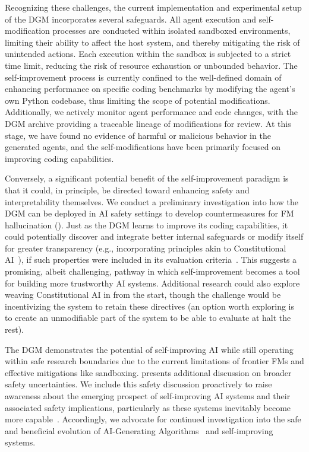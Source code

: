 \documentclass{article}
\begin{document}
Recognizing these challenges, the current implementation and experimental setup of the DGM incorporates several safeguards. All agent execution and self-modification processes are conducted within isolated sandboxed environments, limiting their ability to affect the host system, and thereby mitigating the risk of unintended actions. Each execution within the sandbox is subjected to a strict time limit, reducing the risk of resource exhaustion or unbounded behavior. The self-improvement process is currently confined to the well-defined domain of enhancing performance on specific coding benchmarks by modifying the agent's own Python codebase, thus limiting the scope of potential modifications. Additionally, we actively monitor agent performance and code changes, with the DGM archive providing a traceable lineage of modifications for review. At this stage, we have found no evidence of harmful or malicious behavior in the generated agents, and the self-modifications have been primarily focused on improving coding capabilities.

Conversely, a significant potential benefit of the self-improvement paradigm is that it could, in principle, be directed toward enhancing safety and interpretability themselves. We conduct a preliminary investigation into how the DGM can be deployed in AI safety settings to develop countermeasures for FM hallucination (). Just as the DGM learns to improve its coding capabilities, it could potentially discover and integrate better internal safeguards or modify itself for greater transparency (e.g., incorporating principles akin to Constitutional AI~\citep{bai2022constitutional}), if such properties were included in its evaluation criteria~\citep{rosser2025agentbreeder}. This suggests a promising, albeit challenging, pathway in which self-improvement becomes a tool for building more trustworthy AI systems. Additional research could also explore weaving Constitutional AI in from the start, though the challenge would be incentivizing the system to retain these directives (an option worth exploring is to create an unmodifiable part of the system to be able to evaluate at halt the rest).

The DGM demonstrates the potential of self-improving AI while still operating within safe research boundaries due to the current limitations of frontier FMs and effective mitigations like sandboxing.  presents additional discussion on broader safety uncertainties. We include this safety discussion proactively to raise awareness about the emerging prospect of self-improving AI systems and their associated safety implications, particularly as these systems inevitably become more capable~\citep{yudkowsky2008artificial, bostrom2002a,ecoffet2020open, bengio2024managing,clune2019ai}. Accordingly, we advocate for continued investigation into the safe and beneficial evolution of AI-Generating Algorithms~\citep{clune2019ai} and self-improving systems.
\end{document}
